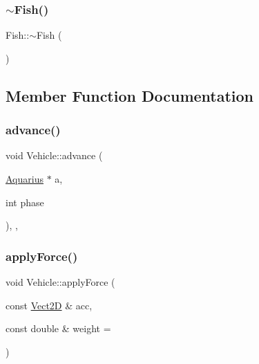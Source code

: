 \mbox{\label{classFish_a23885c7956e22f0181360098cfe16659_a23885c7956e22f0181360098cfe16659}} 
\subsubsection{\texorpdfstring{$\sim$\+Fish()}{~Fish()}}
{\footnotesize\ttfamily Fish\+::$\sim$\+Fish (\begin{DoxyParamCaption}{ }\end{DoxyParamCaption})\hspace{0.3cm}{\ttfamily [virtual]}}



\subsection{Member Function Documentation}
\mbox{\label{classVehicle_aa4ffd7e5fd11297950347de4e8b5ec93_aa4ffd7e5fd11297950347de4e8b5ec93}} 
\subsubsection{\texorpdfstring{advance()}{advance()}}
{\footnotesize\ttfamily void Vehicle\+::advance (\begin{DoxyParamCaption}\item[{\hyperlink{classAquarius}{Aquarius} $\ast$}]{a,  }\item[{int}]{phase }\end{DoxyParamCaption})\hspace{0.3cm}{\ttfamily [final]}, {\ttfamily [virtual]}, {\ttfamily [inherited]}}

\mbox{\label{classVehicle_a82fbbd5aafc1ba89c3daa4da09989bbe_a82fbbd5aafc1ba89c3daa4da09989bbe}} 
\subsubsection{\texorpdfstring{apply\+Force()}{applyForce()}}
{\footnotesize\ttfamily void Vehicle\+::apply\+Force (\begin{DoxyParamCaption}\item[{const \hyperlink{classVect2D}{Vect2D} \&}]{acc,  }\item[{const double \&}]{weight = {} }\end{DoxyParamCaption})\hspace{0.3cm}{\ttfamily [inherited]}}

